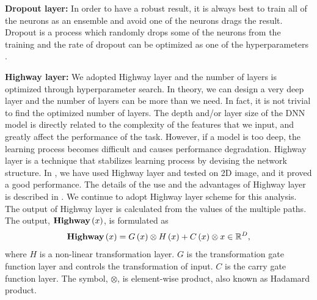 \documentclass[useamsfonts]{pasj01}
\begin{document}
{\bf Dropout layer:}
In order to have a robust result, it is always best to train all of the neurons as an ensemble and avoid one of the neurons drags the result.  Dropout is a process which randomly drops some of the neurons from the training and the rate of dropout can be optimized as one of the hyperparameters \citep{dropout}. 

{\bf Highway layer:}
We adopted Highway layer \citep{srivastava15a} and the number of layers is optimized through hyperparameter search.   In theory, we can design a very deep layer and the number of layers can be more than we need.   In fact, it is not trivial to find the optimized number of layers.   
The depth and/or layer size of the DNN model is directly related to the complexity of the features that we input, and greatly affect the performance of the task.  
However, if a model is too deep, the learning process becomes difficult and causes performance degradation.
Highway layer is a technique that stabilizes learning process by devising the network structure.
In \citet{Kimura17}, we have used Highway layer and tested on 2D image, and it proved a good performance.  The details of the use and the advantages of Highway layer is described in \citet{Kimura17}.  We continue to adopt Highway layer scheme for this analysis.
The output of Highway layer is calculated from the values of the multiple paths.
The output, ${\bf Highway} \left(x\right)$, is formulated as
\begin{equation}
    {\bf Highway} \left(x\right) = G \left(x\right) \otimes H \left(x\right) + C \left(x\right) \otimes x \in \mathbb{R}^D,
\end{equation}
where $H$ is a non-linear transformation layer. $G$ is the transformation gate function layer and controls the transformation of input.  $C$ is the carry gate function layer. The symbol, $\otimes$, is element-wise product, also known as Hadamard product.
\end{document}
